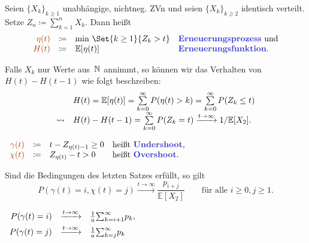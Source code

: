 \documentclass{cheat-sheet}
\newcommand{\E}{\mathbb{E}} %
\newcommand{\Defn}[1]{\textcolor{DefinitionColor}{#1}}
\begin{document}
\begin{defn}
  Seien $\{ X_k \}_{k \geq 1}$ unabhängige, nichtneg. ZVn und seien $\{ X_k \}_{k \geq 2}$ identisch verteilt.
  Setze $Z_n \coloneqq {\sum}_{k=1}^n X_k$.
  Dann heißt
  \[
    \begin{array}{r c l l}
      \Defn{\eta(t)} &\coloneqq& \min\,\Set{k \geq 1}{Z_k > t} &
      \text{\emph{Erneuerungsprozess} und} \\
      \Defn{H(t)} &\coloneqq& \E[\eta(t)]
      & \text{\emph{Erneuerungsfunktion}.}
    \end{array}
  \]
\end{defn}

Falls $X_k$ nur Werte aus~$\mathbb{N}$ annimmt, so können wir das Verhalten von $H(t) - H(t-1)$ wie folgt beschreiben:
\[\begin{array}{r l}
  & H(t) = \E[\eta(t)] = \sum_{k=0}^\infty P(\eta(t) > k) = \sum_{k=0}^\infty P(Z_k \leq t) \\
  \rightsquigarrow & H(t) - H(t-1) = \sum_{k=0}^\infty P(Z_k = t) \xrightarrow{t \to \infty} 1/\E[X_2].
\end{array}\]

\begin{defn}
  $
    \begin{array}[t]{r c l l}
    \Defn{\gamma(t)} &\coloneqq& t - Z_{\eta(t)-1} \geq 0 & \text{heißt \emph{Undershoot},} \\
    \Defn{\chi(t)} &\coloneqq& Z_{\eta(t)} - t > 0 & \text{heißt \emph{Overshoot}.}
    \end{array}
  $
\end{defn}

\begin{satz}
  Sind die Bedingungen des letzten Satzes erfüllt, so gilt
  \[
    P(\gamma(t)=i, \chi(t)=j) \xrightarrow{t \to \infty} \frac{p_{i+j}}{\E[X_2]}
    \qquad \text{für alle } i \geq 0, j \geq 1.
  \]
\end{satz}

\begin{kor}
  $
    \begin{array}[t]{r c l}
      P(\gamma(t) = i) &\xrightarrow{t \to \infty}& \tfrac{1}{a} {\sum}_{k=i+1}^\infty p_k, \\[0.15cm]
      P(\gamma(t) = j) &\xrightarrow{t \to \infty}& \tfrac{1}{a} {\sum}_{k=j}^\infty p_k
    \end{array}
  $
\end{kor}

\end{document}
